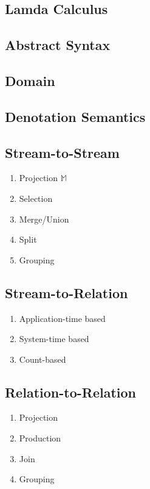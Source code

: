 \subsection*{Lamda Calculus}
\subsection{Abstract Syntax}
\subsection{Domain}
\subsection{Denotation Semantics}


\subsection*{Stream-to-Stream}
\begin{enumerate}
	\item Projection
	$\mathbb{M}$
	\item Selection
	\item Merge/Union
	\item Split
	\item Grouping
	
\end{enumerate}

\subsection*{Stream-to-Relation}
\begin{enumerate}
	\item Application-time based
	\item System-time based
	\item Count-based
\end{enumerate}

\subsection*{Relation-to-Relation}
\begin{enumerate}
	\item Projection
	\item Production
	\item Join
	\item Grouping
	
\end{enumerate}

